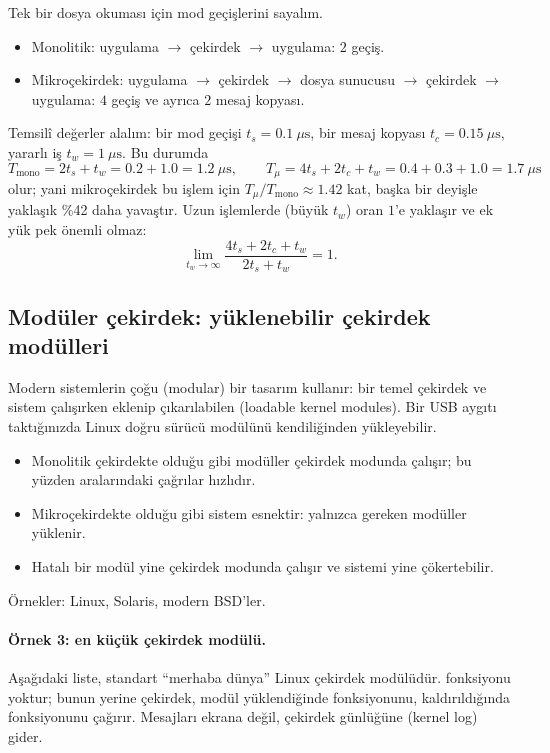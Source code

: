 \begin{example}
Tek bir dosya okuması için mod geçişlerini sayalım.
\begin{itemize}
  \item Monolitik: uygulama $\to$ çekirdek $\to$ uygulama: $2$ geçiş.
  \item Mikroçekirdek: uygulama $\to$ çekirdek $\to$ dosya sunucusu $\to$ çekirdek $\to$ uygulama: $4$ geçiş ve ayrıca $2$ mesaj kopyası.
\end{itemize}
Temsilî değerler alalım: bir mod geçişi $t_{s} = 0.1\ \mu\text{s}$, bir mesaj kopyası $t_{c} = 0.15\ \mu\text{s}$, yararlı iş $t_{w} = 1\ \mu\text{s}$. Bu durumda
\[
T_{\text{mono}} = 2t_{s} + t_{w} = 0.2 + 1.0 = 1.2\ \mu\text{s},
\qquad
T_{\mu} = 4t_{s} + 2t_{c} + t_{w} = 0.4 + 0.3 + 1.0 = 1.7\ \mu\text{s}
\]
olur; yani mikroçekirdek bu işlem için $T_{\mu}/T_{\text{mono}} \approx 1.42$ kat, başka bir deyişle yaklaşık \%42 daha yavaştır. Uzun işlemlerde (büyük $t_{w}$) oran $1$'e yaklaşır ve ek yük pek önemli olmaz:
\[
\lim_{t_{w}\to\infty} \frac{4t_{s} + 2t_{c} + t_{w}}{2t_{s} + t_{w}} = 1 .
\]
\end{example}

\subsection{Modüler çekirdek: yüklenebilir çekirdek modülleri}

Modern sistemlerin çoğu  (modular) bir tasarım kullanır: bir temel çekirdek ve sistem çalışırken eklenip çıkarılabilen  (loadable kernel modules). Bir USB aygıtı taktığınızda Linux doğru sürücü modülünü kendiliğinden yükleyebilir.

\begin{itemize}
  \item[\textcolor{mintdeep}{$+$}] Monolitik çekirdekte olduğu gibi modüller çekirdek modunda çalışır; bu yüzden aralarındaki çağrılar hızlıdır.
  \item[\textcolor{mintdeep}{$+$}] Mikroçekirdekte olduğu gibi sistem esnektir: yalnızca gereken modüller yüklenir.
  \item[\textcolor{red!60!black}{$-$}] Hatalı bir modül yine çekirdek modunda çalışır ve sistemi yine çökertebilir.
\end{itemize}
Örnekler: Linux, Solaris, modern BSD'ler.

\paragraph{Örnek 3: en küçük çekirdek modülü.} Aşağıdaki liste, standart ``merhaba dünya'' Linux çekirdek modülüdür.  fonksiyonu yoktur; bunun yerine çekirdek, modül yüklendiğinde  fonksiyonunu, kaldırıldığında  fonksiyonunu çağırır. Mesajları ekrana değil, çekirdek günlüğüne (kernel log) gider.

